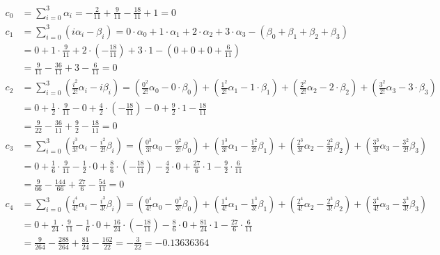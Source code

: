 \documentclass[a4paper, twoside]{report} %
\begin{document}
	\begin{align}
		c_0 &= \sum_{i=0}^{3} \alpha_i = -\frac{2}{11} + \frac{9}{11} - \frac{18}{11} + 1 = 0 \\
		c_1 &= \sum_{i=0}^{3} (i\alpha_i - \beta_i) = 0 \cdot \alpha_0 + 1 \cdot \alpha_1 + 2 \cdot \alpha_2 + 3 \cdot \alpha_3 - (\beta_0 + \beta_1 + \beta_2 + \beta_3) \nonumber \\
		&= 0 + 1 \cdot \frac{9}{11} + 2 \cdot \left(-\frac{18}{11}\right) + 3 \cdot 1 - \left(0 + 0 + 0 + \frac{6}{11}\right) \nonumber \\
		&= \frac{9}{11} - \frac{36}{11} + 3 - \frac{6}{11} = 0 \\
		c_2 &= \sum_{i=0}^{3} \left(\frac{i^2}{2!} \alpha_i - i \beta_i \right) = \left(\frac{0^2}{2!} \alpha_0 - 0 \cdot \beta_0\right) + \left(\frac{1^2}{2!} \alpha_1 - 1 \cdot \beta_1\right) + \left(\frac{2^2}{2!} \alpha_2 - 2 \cdot \beta_2\right) + \left(\frac{3^2}{2!} \alpha_3 - 3 \cdot \beta_3\right) \nonumber \\
		&= 0 + \frac{1}{2} \cdot \frac{9}{11} - 0 + \frac{4}{2} \cdot \left(-\frac{18}{11}\right) - 0 + \frac{9}{2} \cdot 1 - \frac{18}{11} \nonumber \\
		&= \frac{9}{22} - \frac{36}{11} + \frac{9}{2} - \frac{18}{11} = 0 \\
		c_3 &= \sum_{i=0}^{3} \left(\frac{i^3}{3!} \alpha_i - \frac{i^2}{2!} \beta_i \right) = \left(\frac{0^3}{3!} \alpha_0 - \frac{0^2}{2!} \beta_0\right) + \left(\frac{1^3}{3!} \alpha_1 - \frac{1^2}{2!} \beta_1\right) + \left(\frac{2^3}{3!} \alpha_2 - \frac{2^2}{2!} \beta_2\right) + \left(\frac{3^3}{3!} \alpha_3 - \frac{3^2}{2!} \beta_3\right) \nonumber \\
		&= 0 + \frac{1}{6} \cdot \frac{9}{11} - \frac{1}{2} \cdot 0 + \frac{8}{6} \cdot \left(-\frac{18}{11}\right) - \frac{4}{2} \cdot 0 + \frac{27}{6} \cdot 1 - \frac{9}{2} \cdot \frac{6}{11} \nonumber \\
		&= \frac{9}{66} - \frac{144}{66} + \frac{27}{6} - \frac{54}{11} = 0 \\
		c_4 &= \sum_{i=0}^{3} \left(\frac{i^4}{4!} \alpha_i - \frac{i^3}{3!} \beta_i \right) = \left(\frac{0^4}{4!} \alpha_0 - \frac{0^3}{3!} \beta_0 \right) + \left(\frac{1^4}{4!} \alpha_1 - \frac{1^3}{3!} \beta_1 \right) + \left(\frac{2^4}{4!} \alpha_2 - \frac{2^3}{3!} \beta_2 \right) + \left(\frac{3^4}{4!} \alpha_3 - \frac{3^3}{3!} \beta_3 \right) \nonumber \\
		&= 0 + \frac{1}{24} \cdot \frac{9}{11} - \frac{1}{6} \cdot 0 + \frac{16}{24} \cdot \left(-\frac{18}{11}\right) - \frac{8}{6} \cdot 0 + \frac{81}{24} \cdot 1 - \frac{27}{6} \cdot \frac{6}{11} \nonumber \\
		&= \frac{9}{264} - \frac{288}{264} + \frac{81}{24} - \frac{162}{22} = -\frac{3}{22} = - 0.13636364
	\end{align}
\end{document}
